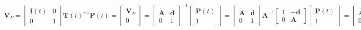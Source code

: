 \begin{equation}
\mathbf{V}_P = 
\begin{bmatrix}
\mathbf{I}(t) & 0 \\
0 & 1 
\end{bmatrix}
\mathbf{T}(t)^{-1} \mathbf{P}(t) = 
\begin{bmatrix}
\mathbf{V}_P \\
0
\end{bmatrix} = 
\begin{bmatrix}
\dot{\mathbf{A}} & \mathbf{d} \\
0 & 1 
\end{bmatrix}^{-1}
\begin{bmatrix}
\mathbf{P}(t) \\
1
\end{bmatrix} 
= 
\begin{bmatrix}
\dot{\mathbf{A}} & \mathbf{d} \\
0 & 1 
\end{bmatrix}
\mathbf{A}^{-1}
\begin{bmatrix}
1 & -\mathbf{d} \\
0 & \mathbf{A} 
\end{bmatrix}
\begin{bmatrix}
\mathbf{P}(t) \\
1
\end{bmatrix} 
= 
\begin{bmatrix}
\dot{\mathbf{A}} & \mathbf{d} \\
0 & 1 
\end{bmatrix}
\begin{bmatrix}
\mathbf{A}^{-1} & -\mathbf{A}^{-1}\mathbf{d} + \dot{\mathbf{d}} \\
0 & \mathbf{A} 
\end{bmatrix}
\begin{bmatrix}
\mathbf{P}(t) \\
1
\end{bmatrix} 
= 
\begin{bmatrix}
\dot{\mathbf{A}} \mathbf{A}^{-1} & -\dot{\mathbf{A}}\mathbf{A}^{-1}\mathbf{d} + \dot{\mathbf{d}} \\
0 & 0 
\end{bmatrix}
\begin{bmatrix}
\mathbf{P}(t) \\
1
\end{bmatrix} 
= 
\begin{bmatrix}
\dot{\mathbf{A}} \mathbf{A}^{-1} & -\dot{\mathbf{A}}\mathbf{A}^{-1}\mathbf{d} + \dot{\mathbf{d}} \\
0 & 0 
\end{bmatrix}
\begin{bmatrix}
\mathbf{P}(t) \\
1
\end{bmatrix}~
\mathbf{V}_P =[\mathbf{S}]\mathbf{P}.~
\end{equation}


